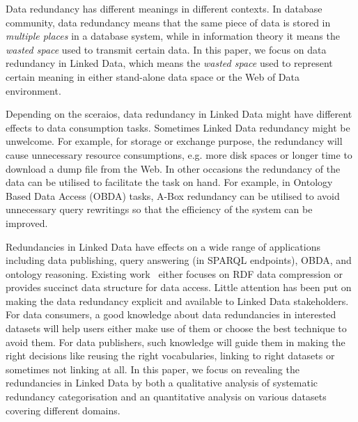 Data redundancy has different meanings in different contexts. In database community, data redundancy means that the same piece of data is stored in \emph{multiple places} in a database system, while in information theory it means the \emph{wasted space} used to transmit certain data. In this paper, we focus on data redundancy in Linked Data, which means the \emph{wasted space} used to represent certain meaning in either stand-alone data space or the Web of Data environment.

Depending on the sceraios, data redundancy in Linked Data might have different effects to data consumption tasks. Sometimes Linked Data redundancy might be unwelcome. For example, for storage or exchange purpose, the redundancy will cause unnecessary resource consumptions, e.g. more disk spaces or longer time to download a dump file from the Web. In other occasions the redundancy of the data can be utilised to facilitate the task on hand. For example, in Ontology Based Data Access (OBDA) tasks, A-Box redundancy can be utilised to avoid unnecessary query rewritings so that the efficiency of the system can be improved. 

Redundancies in Linked Data have effects on a wide range of applications including data publishing, query answering (in SPARQL endpoints), OBDA, and ontology reasoning. Existing work~\cite{joshi2013logical,cure2014waterfowl,fernandez2013binary} either focuses on RDF data compression or provides succinct data structure for data access. Little attention has been put on making the data redundancy explicit and available to Linked Data stakeholders. For data consumers, a good knowledge about data redundancies in interested datasets will help users either make use of them or choose the best technique to avoid them. For data publishers, such knowledge will guide them in making the right decisions like reusing the right vocabularies, linking to right datasets or sometimes not linking at all. In this paper, we focus on revealing the redundancies in Linked Data by both a qualitative analysis of systematic redundancy categorisation and an quantitative analysis on various datasets covering different domains.

